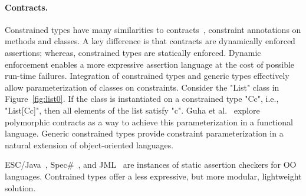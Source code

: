 
\paragraph{Contracts.}

Constrained types have many similarities to
contracts~\cite{Parnas72,eiffel,Findler02},
constraint annotations on methods and classes.
A key difference is that contracts are dynamically enforced
assertions; whereas, constrained types are statically enforced.
Dynamic enforcement enables a more expressive assertion language
at the cost of possible run-time failures.
Integration of constrained types and generic types
effectively allow parameterization of classes on constraints.
Consider the \xcd"List" class in Figure~\ref{fig:list0}.
If the class is instantiated on a constrained type \xcd"C{c}",
i.e., \xcd"List[C{c}]",
then all elements of the list satisfy \xcd"c".
Guha et al.~\cite{GMFK07} 
explore polymorphic contracts as a way to achieve this
parameterization in a functional language.
Generic constrained types provide constraint parameterization
in a natural extension of object-oriented languages.

ESC/Java~\cite{escjava-pldi02}, Spec\#~\cite{specsharp}, and
JML~\cite{leavens00jml} are instances of
static assertion checkers for OO languages.  Contrained types
offer a less expressive, but more modular, lightweight solution.

